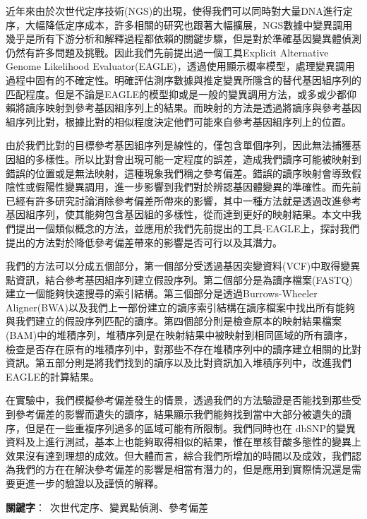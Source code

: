近年來由於次世代定序技術(NGS)的出現，使得我們可以同時對大量DNA進行定序，大幅降低定序成本，許多相關的研究也跟著大幅擴展，NGS數據中變異調用幾乎是所有下游分析和解釋過程都依賴的關鍵步驟，但是對於準確基因變異體偵測仍然有許多問題及挑戰。因此我們先前提出過一個工具Explicit Alternative Genome Likelihood Evaluator(EAGLE)，透過使用顯示概率模型，處理變異調用過程中固有的不確定性。明確評估測序數據與推定變異所隱含的替代基因組序列的匹配程度。但是不論是EAGLE的模型抑或是一般的變異調用方法，或多或少都仰賴將讀序映射到參考基因組序列上的結果。而映射的方法是透過將讀序與參考基因組序列比對，根據比對的相似程度決定他們可能來自參考基因組序列上的位置。

由於我們比對的目標參考基因組序列是線性的，僅包含單個序列，因此無法捕獲基因組的多樣性。所以比對會出現可能一定程度的誤差，造成我們讀序可能被映射到錯誤的位置或是無法映射，這種現象我們稱之參考偏差。錯誤的讀序映射會導致假陰性或假陽性變異調用，進一步影響到我們對於辨認基因體變異的準確性。而先前已經有許多研究討論消除參考偏差所帶來的影響，其中一種方法就是透過改進參考基因組序列，使其能夠包含基因組的多樣性，從而達到更好的映射結果。本文中我們提出一個類似概念的方法，並應用於我們先前提出的工具-EAGLE上，探討我們提出的方法對於降低參考偏差帶來的影響是否可行以及其潛力。

我們的方法可以分成五個部分，第一個部分受透過基因突變資料(VCF)中取得變異點資訊，結合參考基因組序列建立假設序列。第二個部分是為讀序檔案(FASTQ)建立一個能夠快速搜尋的索引結構。第三個部分是透過Burrows-Wheeler Aligner(BWA)以及我們上一部份建立的讀序索引結構在讀序檔案中找出所有能夠與我們建立的假設序列匹配的讀序。第四個部分則是檢查原本的映射結果檔案(BAM)中的堆積序列，堆積序列是在映射結果中被映射到相同區域的所有讀序，檢查是否存在原有的堆積序列中，對那些不存在堆積序列中的讀序建立相關的比對資訊。第五部分則是將我們找到的讀序以及比對資訊加入堆積序列中，改進我們EAGLE的計算結果。

在實驗中，我們模擬參考偏差發生的情景，透過我們的方法驗證是否能找到那些受到參考偏差的影響而遺失的讀序，結果顯示我們能夠找到當中大部分被遺失的讀序，但是在一些重複序列過多的區域可能有所限制。我們同時也在 dbSNP的變異資料及上進行測試，基本上也能夠取得相似的結果，惟在單核苷酸多態性的變異上效果沒有達到理想的成效。但大體而言，綜合我們所增加的時間以及成效，我們認為我們的方在在解決參考偏差的影響是相當有潛力的，但是應用到實際情況還是需要更進一步的驗證以及謹慎的解釋。

\begin{flushleft}
\mbox{{\bf 關鍵字}： 次世代定序、變異點偵測、參考偏差 }
\end{flushleft}

